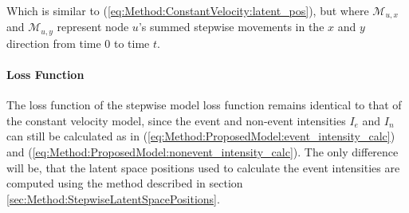 Which is similar to (\ref{eq:Method:ConstantVelocity:latent_pos}), but where $\mathcal{M}_{u,x}$ and $\mathcal{M}_{u,y}$ represent node $u$'s summed stepwise movements in the $x$ and $y$ direction from time 0 to time $t$.


\paragraph{Loss Function}
The loss function of the stepwise model loss function remains identical to that of the constant velocity model, since the event and non-event intensities $I_e$ and $I_n$ can still be calculated as in (\ref{eq:Method:ProposedModel:event_intensity_calc}) and (\ref{eq:Method:ProposedModel:nonevent_intensity_calc}). The only difference will be, that the latent space positions used to calculate the event intensities are computed using the method described in section \ref{sec:Method:StepwiseLatentSpacePositions}.



